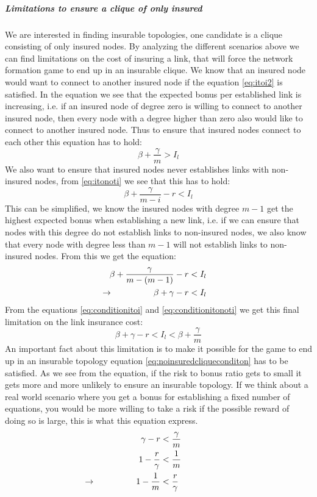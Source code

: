 \subparagraph{Limitations to ensure a clique of only insured}
We are interested in finding insurable topologies, one candidate is a clique consisting of only insured nodes. By analyzing the different scenarios above we can find limitations on the cost of insuring a link, that will force the network formation game to end up in an insurable clique.
We know that an insured node would want to connect to another insured node if the equation \ref{eq:itoi2} is satisfied. 
In the equation we see that the expected bonus per established link is increasing, i.e. if an insured node of degree zero is willing to connect to another insured node, then every node with a degree higher than zero also would like to connect to another insured node. Thus to ensure that insured nodes connect to each other this equation has to hold:
\begin{equation}
\beta+\frac{\gamma}{m}>I_{l}
\label{eq:conditionitoi}
\end{equation}
We also want to ensure that insured nodes never establishes links with non-insured nodes, from \ref{eq:itonoti} we see that this has to hold:
\begin{equation}
\beta+\frac{\gamma}{m-i}-r < I_{l}
\label{eq:conditionitonoti}
\end{equation}
This can be simplified, we know the insured nodes with degree $m-1$ get the highest expected bonus when establishing a new link, i.e. if we can ensure that nodes with this degree do not establish links to non-insured nodes, we also know that every node with degree less than $m-1$ will not establish links to non-insured nodes. From this we get the equation:
\begin{eqnarray}
\beta+\frac{\gamma}{m-(m-1)}-r&<I_{l} \nonumber\\
\llap{$\rightarrow$\hspace{50pt}} \beta+\gamma-r&<I_{l}
\label{eq:condition-i-to-noti}
\end{eqnarray}
From the equations \ref{eq:conditionitoi} and \ref{eq:conditionitonoti} we get this final limitation on the link insurance cost:
\begin{equation}
\beta+\gamma-r<I_{l}<\beta+\frac{\gamma}{m}
\label{eq:final-insurance-clique-condition}
\end{equation}
An important fact about this limitation is to make it possible for the game to end up in an insurable topology equation \ref{eq:noinsuredcliqueconditon} has to be satisfied. As we see from the equation, if the risk to bonus ratio gets to small it gets more and more unlikely to ensure an insurable topology. If we think about a real world scenario where you get a bonus for establishing a fixed number of equations, you would be more willing to take a risk if the possible reward of doing so is large, this is what this equation express. 
\begin{eqnarray}
\gamma-r &<\frac{\gamma}{m}\nonumber \\
1-\frac{r}{\gamma}&<\frac{1}{m} \nonumber \\
\llap{$\rightarrow$\hspace{50pt}}1-\frac{1}{m}&<\frac{r}{\gamma}
\label{eq:noinsuredcliqueconditon}
\end{eqnarray}

